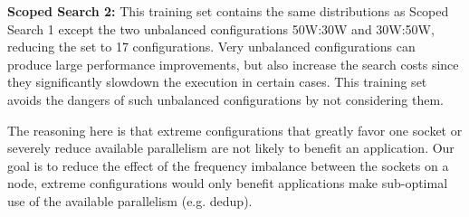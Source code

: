 \textbf{Scoped Search 2:}
This training set contains the same distributions as Scoped Search 1 except the two
unbalanced configurations 50W:30W and 30W:50W, reducing the set to 17 configurations.
Very unbalanced configurations can produce large performance improvements, but also
increase the search costs since they significantly slowdown the execution in certain
cases.  This training set avoids the dangers of such unbalanced configurations by not
considering them. 

The reasoning here is that extreme configurations that greatly favor one socket or
severely reduce available parallelism are not likely to benefit an application.  Our goal
is to reduce the effect of the frequency imbalance between the sockets on a node, extreme
configurations would only benefit applications make sub-optimal use of the available
parallelism (e.g. dedup).

